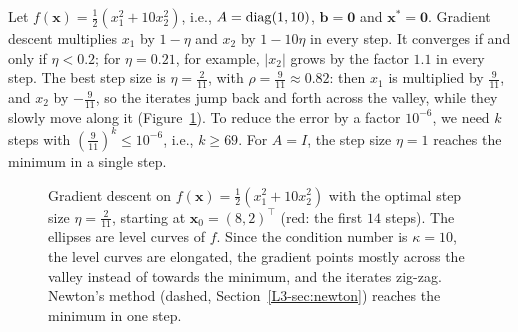 \begin{example}\label{L3-ex:gd-quadratic}
    Let $f(\mathbf{x}) = \frac{1}{2}(x_1^2 + 10x_2^2)$, i.e., $A = \operatorname{diag}(1, 10)$, $\mathbf{b} = \mathbf{0}$ and $\mathbf{x}^* = \mathbf{0}$. Gradient descent multiplies $x_1$ by $1 - \eta$ and $x_2$ by $1 - 10\eta$ in every step. It converges if and only if $\eta < 0.2$; for $\eta = 0.21$, for example, $|x_2|$ grows by the factor $1.1$ in every step. The best step size is $\eta = \frac{2}{11}$, with $\rho = \frac{9}{11} \approx 0.82$: then $x_1$ is multiplied by $\frac{9}{11}$, and $x_2$ by $-\frac{9}{11}$, so the iterates jump back and forth across the valley, while they slowly move along it (Figure~\ref{L3-fig:gd}). To reduce the error by a factor $10^{-6}$, we need $k$ steps with $(\frac{9}{11})^k \leq 10^{-6}$, i.e., $k \geq 69$. For $A = I$, the step size $\eta = 1$ reaches the minimum in a single step.
\end{example}

\begin{figure}[ht]
    \centering
    \caption{Gradient descent on $f(\mathbf{x}) = \frac{1}{2}(x_1^2 + 10x_2^2)$ with the optimal step size $\eta = \frac{2}{11}$, starting at $\mathbf{x}_0 = (8, 2)^\top$ (red: the first $14$ steps). The ellipses are level curves of $f$. Since the condition number is $\kappa = 10$, the level curves are elongated, the gradient points mostly across the valley instead of towards the minimum, and the iterates zig-zag. Newton's method (dashed, Section~\ref{L3-sec:newton}) reaches the minimum in one step.}
    \label{L3-fig:gd}
\end{figure}

